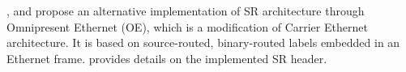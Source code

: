\cite{scalablesegment1}, \cite{scalablesegment2} and \cite{scalablesegment3} propose an alternative implementation of SR architecture through Omnipresent Ethernet (OE), which is a modification of Carrier Ethernet architecture. It is based on source-routed, binary-routed labels embedded in an Ethernet frame. \cite{scalablesegment3} provides details on the implemented SR header. 
